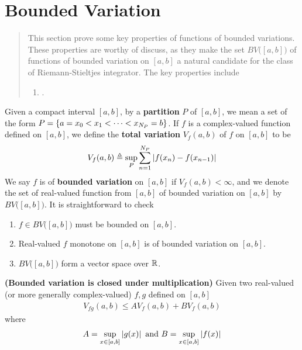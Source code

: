 \documentclass{report}
\begin{document}
\section{Bounded Variation}
\begin{abstract}
This section prove some key properties of functions of bounded variations. These properties are worthy of discuss, as they make the set $BV\big([a,b] \big)$ of functions of bounded variation on $[a,b]$ a natural candidate for the class of Riemann-Stieltjes integrator. The key properties include 
\begin{enumerate}[label=(\alph*)]
  \item {}.  
\end{enumerate}
\end{abstract}
\begin{mdframed}
 Given a compact interval $[a,b]$, by a \textbf{partition} $P$ of $[a,b]$, we mean a set of the form $P=\{ a=x_0<x_1 < \cdots  < x_{N_P} =b \}$. If $f$ is a complex-valued function defined on $[a,b]$, we define the \textbf{total variation} $V_f(a,b)$ of $f$ on  $[a,b]$ to be 
\begin{align*}
V_f(a,b)\triangleq \sup_P \sum_{n=1}^{N_P} \left|f(x_n)-f(x_{n-1})\right|
\end{align*}
We say $f$ is of \textbf{bounded variation} on $[a,b]$ if $V_f(a,b)<\infty$, and we denote the set of real-valued function from $[a,b]$ of bounded variation on $[a,b]$ by $BV\big([a,b] \big)$.  It is straightforward to check 
\begin{enumerate}[label=(\alph*)]
  \item  $f \in BV\big([a,b] \big)$ must be bounded on $[a,b]$. 
  \item Real-valued $f$ monotone on $[a,b]$ is of bounded variation on $[a,b]$. 
  \item $BV\big([a,b] \big)$ form a vector space over $\mathbb{R}$. 
\end{enumerate}
\end{mdframed}
\begin{theorem}
\textbf{(Bounded variation is closed under multiplication)} Given two real-valued (or more generally complex-valued) $f,g$  defined on $[a,b]$ 
\begin{align*}
V_{fg}(a,b)\leq AV_f(a,b)+BV_f(a,b)
\end{align*}
where 
\begin{align*}
A= \sup_{x \in [a,b]}\left|g(x)\right|\text{ and }B=\sup_{x\in [a,b]}\left|f(x)\right|
\end{align*}
\end{theorem}
\end{document}
